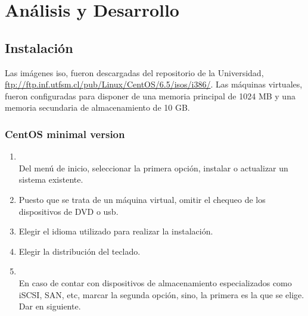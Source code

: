 \documentclass[11pt]{article}
\begin{document}
\section{Análisis y Desarrollo}
\subsection{Instalación}
Las imágenes iso, fueron descargadas del repositorio de la Universidad, \url{ftp://ftp.inf.utfsm.cl/pub/Linux/CentOS/6.5/isos/i386/}. Las máquinas virtuales, fueron configuradas para disponer de una memoria principal de 1024 MB y una memoria secundaria de almacenamiento de 10 GB.
	\subsubsection{CentOS minimal version}
		\begin{enumerate}
			\item 
				\begin{minipage}[t]{\linewidth}
			          \raggedright
			          \medskip
			          \\Del menú de inicio, seleccionar la primera opción, instalar o actualizar un sistema existente.
			    \end{minipage}
			
			\item Puesto que se trata de un máquina virtual, omitir el chequeo de los dispositivos de DVD o usb.
			\item Elegir el idioma utilizado para realizar la instalación.
			\item Elegir la distribución del teclado.

			\item 
				\begin{minipage}[t]{\linewidth}
			          \raggedright
			          \medskip
			          \\En caso de contar con dispositivos de almacenamiento especializados como iSCSI, SAN, etc, marcar la segunda opción, sino, la primera es la que se elige. Dar en siguiente.
			    \end{minipage}			


\end{enumerate}
\end{document}
